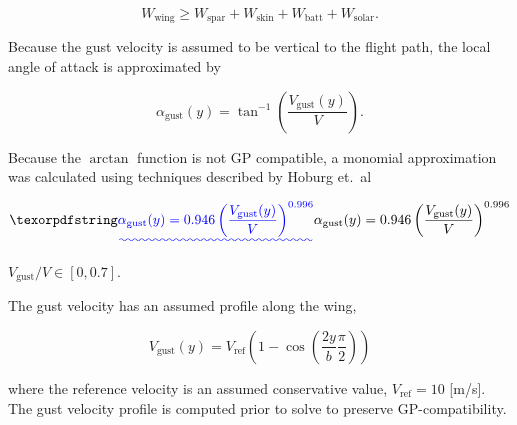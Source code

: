 \begin{equation}
    W_{\text{wing}} \geq W_{\text{spar}} + W_{\text{skin}} + W_{\text{batt}} + W_{\text{solar}}.
\end{equation}

Because the gust velocity is assumed to be vertical to the flight path, the local angle of attack is approximated by 

\begin{equation}
    \label{e:gustalpha}
    \alpha_{\text{gust}}(y)  = \tan^{-1}\left(\frac{V_{\text{gust}}(y)}{V} \right).
\end{equation}

Because the $\arctan$ function is not GP compatible, a monomial approximation was calculated using techniques described by Hoburg et.~al\cite{fitting}\DIFdelbegin {}\DIFdelend \DIFaddbegin \DIFadd{,
}

\begin{equation}
    \DIFadd{\alpha_{\text{gust}}(y)  = 0.946 \left(\frac{V_{\text{gust}}(y)}{V} \right)^{0.996}
}\end{equation}

\DIFaddend $V_{\text{gust}}/V \in [0, 0.7]$.

\DIFdelbegin %
{%
\textbf{}%
}

\DIFdelend The gust velocity has an assumed profile along the wing\cite{acgust},

\begin{equation}
    \label{e:gustwind}
    V_{\text{gust}}(y) = V_{\text{ref}} \left(1-\cos\left(\frac{2y}{b} \frac{\pi}{2} \right) \right)
\end{equation}

where the reference velocity is an assumed conservative value\cite{acgust}, $V_{\text{ref}} = 10$ [m/s]. The gust velocity profile is computed prior to solve to preserve GP-compatibility.

